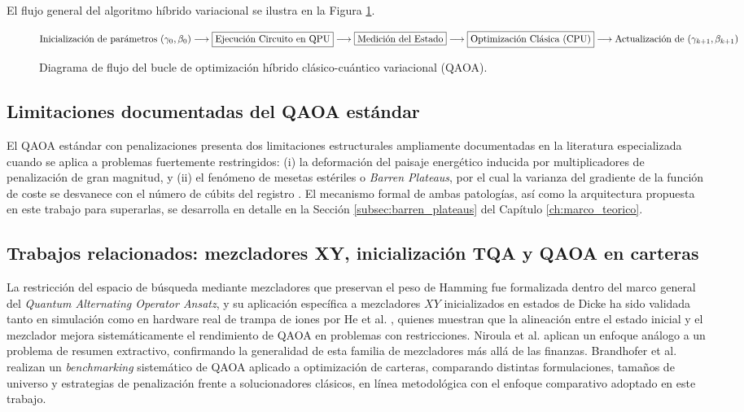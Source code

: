 El flujo general del algoritmo híbrido variacional se ilustra en la Figura \ref{fig:flujo_qaoa}.

\begin{figure}[htbp]
    \centering
    \vspace*{0.5cm}
    $\text{Inicialización de parámetros } (\gamma_0, \beta_0) \longrightarrow \framebox{Ejecución Circuito en QPU} \longrightarrow \framebox{Medición del Estado} \longrightarrow \framebox{Optimización Clásica (CPU)} \longrightarrow \text{Actualización de } (\gamma_{k+1}, \beta_{k+1})$
    \vspace*{0.5cm}
    \caption{Diagrama de flujo del bucle de optimización híbrido clásico-cuántico variacional (QAOA).}
    \label{fig:flujo_qaoa}
\end{figure}


\subsection{Limitaciones documentadas del QAOA estándar}
\label{subsec:limitaciones_qaoa}

El QAOA estándar con penalizaciones
presenta dos limitaciones estructurales ampliamente documentadas en la
literatura especializada cuando se aplica a problemas fuertemente
restringidos: (i) la deformación del paisaje energético inducida por
multiplicadores de penalización de gran magnitud, y (ii) el fenómeno de
mesetas estériles o \textit{Barren Plateaus}, por el cual la varianza del
gradiente de la función de coste se desvanece con el número de cúbits del
registro \cite{McClean2018}. El mecanismo formal de ambas patologías, así
como la arquitectura propuesta en este trabajo para superarlas, se
desarrolla en detalle en la Sección \ref{subsec:barren_plateaus} del
Capítulo \ref{ch:marco_teorico}.

\subsection{Trabajos relacionados: mezcladores XY, inicialización TQA y QAOA en carteras}
\label{subsec:trabajos_relacionados}

La restricción del espacio de búsqueda mediante mezcladores que preservan el peso de
Hamming fue formalizada dentro del marco general del \textit{Quantum Alternating
Operator Ansatz}, y su aplicación específica a mezcladores $XY$ inicializados en estados
de Dicke ha sido validada tanto en simulación como en hardware real de trampa de iones
por He et al. \cite{He2023}, quienes muestran que la alineación entre el estado inicial y
el mezclador mejora sistemáticamente el rendimiento de QAOA en problemas con
restricciones. Niroula et al. \cite{Niroula2022} aplican un enfoque análogo a un problema
de resumen extractivo, confirmando la generalidad de esta familia de mezcladores más allá
de las finanzas. Brandhofer et al. \cite{Brandhofer2022} realizan un \textit{benchmarking}
sistemático de QAOA aplicado a optimización de carteras, comparando distintas
formulaciones, tamaños de universo y estrategias de penalización frente a solucionadores
clásicos, en línea metodológica con el enfoque comparativo adoptado en este trabajo.

